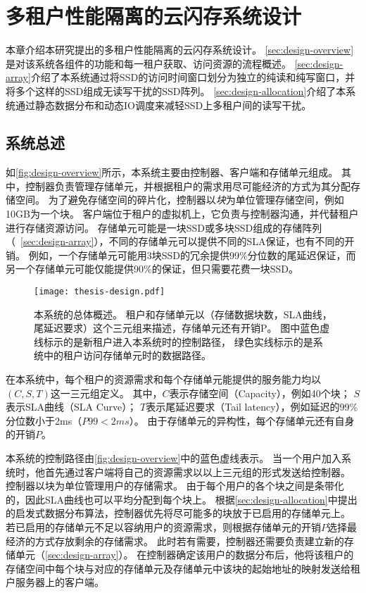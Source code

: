 
\chapter{多租户性能隔离的云闪存系统设计}
\label{chap:design}

本章介绍本研究提出的多租户性能隔离的云闪存系统设计。
\autoref{sec:design-overview}是对该系统各组件的功能和每一租户获取、访问资源的流程概述。
\autoref{sec:design-array}介绍了本系统通过将SSD的访问时间窗口划分为独立的纯读和纯写窗口，并将多个这样的SSD组成无读写干扰的SSD阵列。
\autoref{sec:design-allocation}介绍了本系统通过静态数据分布和动态IO调度来减轻SSD上多租户间的读写干扰。

\section{系统总述}
\label{sec:design-overview}

如\autoref{fig:design-overview}所示，本系统主要由控制器、客户端和存储单元组成。
其中，控制器负责管理存储单元，并根据租户的需求用尽可能经济的方式为其分配存储空间。
为了避免存储空间的碎片化，控制器以\textit{块}为单位管理存储空间，例如10GB为一个块。
客户端位于租户的虚拟机上，它负责与控制器沟通，并代替租户进行存储资源访问。
存储单元可能是一块SSD或多块SSD组成的存储阵列（~\autoref{sec:design-array}），不同的存储单元可以提供不同的SLA保证，也有不同的开销。
例如，一个存储单元可能用3块SSD的冗余提供99\%分位数的尾延迟保证，而另一个存储单元可能仅能提供90\%的保证，但只需要花费一块SSD。

\begin{figure}[h]
  \centering
  \texttt{[image: thesis-design.pdf]}
  \caption{
      本系统的总体概述。
      租户和存储单元以（存储数据块数，SLA曲线，尾延迟要求）这个三元组来描述，存储单元还有开销P。
      图中蓝色虚线标示的是新租户进入本系统时的控制路径，
      绿色实线标示的是系统中的租户访问存储单元时的数据路径。
      }
  \label{fig:design-overview}
\end{figure}

在本系统中，每个租户的资源需求和每个存储单元能提供的服务能力均以$(C, S, T)$这一三元组定义。
其中，$C$表示存储空间（Capacity），例如40个块；
$S$表示SLA曲线（SLA Curve）；
$T$表示尾延迟要求（Tail latency），例如延迟的99\%分位数小于2ms（$P99 < 2ms$）。 
由于存储单元的异构性，每个存储单元还有自身的开销$P$。

本系统的控制路径由\autoref{fig:design-overview}中的蓝色虚线表示。
当一个用户加入系统时，他首先通过客户端将自己的资源需求以以上三元组的形式发送给控制器。
控制器以块为单位管理用户的存储需求。
由于每个用户的各个块之间是条带化的\cite{patterson1988case}，因此SLA曲线也可以平均分配到每个块上。
根据\autoref{sec:design-allocation}中提出的启发式数据分布算法，控制器优先将尽可能多的块放于已启用的存储单元上。
若已启用的存储单元不足以容纳用户的资源需求，则根据存储单元的开销$P$选择最经济的方式存放剩余的存储需求。
此时若有需要，控制器还需要负责建立新的存储单元（\autoref{sec:design-array}）。
在控制器确定该用户的数据分布后，他将该租户的存储空间中每个块与对应的存储单元及存储单元中该块的起始地址的映射发送给租户服务器上的客户端。

